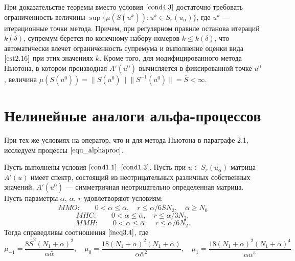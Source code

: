 {\remark При доказательстве теоремы вместо условия  $\eqref{cond4.3}$ достаточно требовать ограниченность величины $\sup\{\mu(S(u^k)): u^k \in S_r(u_\alpha)\}$, где $u^k$ --- итерационные точки метода. Причем, при регулярном правиле останова итераций $k(\delta)$, супремум берется по конечному набору номеров $k\le k(\delta)$, что автоматически влечет ограниченность супремума и выполнение оценки вида $\eqref{est2.16}$ при этих значениях $k$. Кроме того, для модифицированного метода Ньютона, в котором производная $A'(u^0)$ вычисляется в фиксированной точке $u^0$, величина $\mu(S(u^0))=\|S(u^0)\|\|S^{-1}(u^0)\|=\bar S<\infty$.}

\newpage
\section{Нелинейные аналоги альфа-процессов}
При тех же условиях на оператор, что и для метода Ньютона в параграфе 2.1, исследуем процессы $\eqref{equ_alphaproc}$.
\begin{theorem}\label{teo4.2}
	Пусть выполнены условия $\eqref{cond1.1}$--$\eqref{cond1.3}$. Пусть при $u \in S_r(u_\alpha)$ матрица $A'(u)$ имеет спектр, состоящий из неотрицательных различных собственных значений, $A'(u^0)$ --- симметричная неотрицательно определенная матрица. Пусть параметры $\alpha$, $\bar{\alpha}$, $r$ удовлетворяют условиям: 
	\begin{equation}\label{cond4.4}
	MMO:\qquad 0<\alpha\le\bar\alpha, \quad r\le\alpha /6\bar SN_2, \quad \bar\alpha \ge N_0
	\end{equation}
	\begin{equation}\label{cond4.5}
	MHC:\qquad 0<\alpha\le\bar\alpha, \quad r\le\alpha /3N_2,
	\end{equation}
	\begin{equation}\label{cond4.6}
	MMH:\qquad 0<\alpha\le\bar\alpha, \quad r\le\alpha /6N_2.
	\end{equation}
	Тогда справедливы соотношения  $\eqref{ineq3.4}$, где
	\begin{equation}\label{eq4.7}
	\mu _{-1}=\frac{8\bar S^2(N_1+\alpha)^2}{\alpha\bar\alpha}, \quad \mu _0=\frac{18(N_1+\alpha)^2(N_1+\bar\alpha)}{\alpha\bar\alpha ^2}, \quad \mu _1=\frac{18(N_1+\alpha)^2(N_1+\bar\alpha)^4}{\alpha\bar\alpha ^5}
	\end{equation}
\end{theorem}
